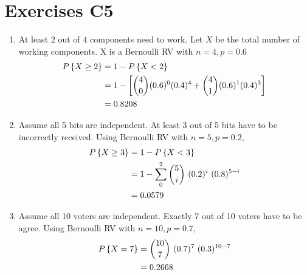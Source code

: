 \chapter*{Exercises C5}

\begin{enumerate}
	\item At least $ 2 $ out of $ 4 $ components need to work. Let $ X $ be the total number of working components. X is a Bernoulli RV with $ n = 4, p = 0.6 $\\
	
	\begin{subequations}
		\begin{align}
			P \left\{X \geq 2 \right\} &= 1 - P \left\{X < 2 \right\} \\
			&= 1 - \left[\binom{4}{0} (0.6)^0 (0.4)^4 + \binom{4}{1} (0.6)^1 (0.4)^3\right] \nonumber \\
			&= 0.8208 \nonumber
		\end{align}\\
	\end{subequations}

	\item Assume all 5 bits are independent.  At least 3 out of 5 bits have to be incorrectly received. Using Bernoulli RV with $ n = 5, p = 0.2 $, \\
	
	\begin{subequations}
		\begin{align}
			P \left\{X \geq 3 \right\} &= 1 - P \left\{X < 3 \right\} \\
			&= 1 - \sum\limits_{0}^{2} \binom{5}{i}\ (0.2)^i\ (0.8)^{5-i} \nonumber \\
			&= 0.0579 \nonumber
		\end{align}\\
	\end{subequations}

	\item Assume all 10 voters are independent.  Exactly 7 out of 10 voters have to be agree. Using Bernoulli RV with $ n = 10, p = 0.7 $, \\
	
	\begin{subequations}
		\begin{align}
			P \left\{X = 7 \right\} &= \binom{10}{7}\ (0.7)^7\ (0.3)^{10-7}  \\
			&= 0.2668 \nonumber
		\end{align}\\
	\end{subequations} 


\end{enumerate}
